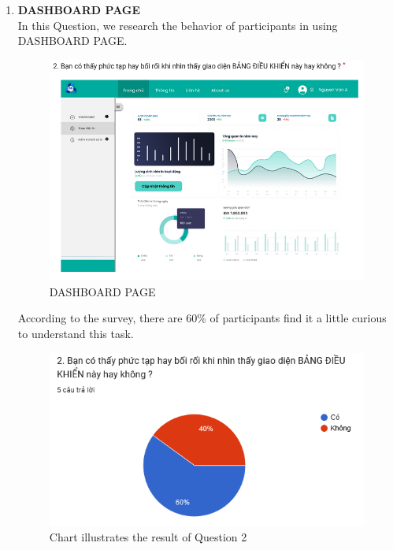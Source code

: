 \documentclass[a4paper]{report}
\begin{document}
\begin{enumerate}
    \item \textbf{DASHBOARD PAGE} \\
    In this Question, we research the behavior of participants in using DASHBOARD PAGE.
\begin{figure}[!h]
    \centering
    \includegraphics[width=0.8\linewidth]{images/image_uasbility/Q2_SPSO.png}
    \caption{DASHBOARD PAGE}
    \label{fig:DASHBOARD}
\end{figure}
\newpage
According to the survey, there are 60\% of participants find it a little curious to understand this task.
\begin{figure}[!h]
    \centering
    \includegraphics[width=0.8\linewidth]{images/image_uasbility/A2_SPSO.png}
    \caption{Chart illustrates the result of Question 2}
    \label{fig:Chart illustrates the result of Question 2}
\end{figure}



\end{enumerate}
\end{document}
